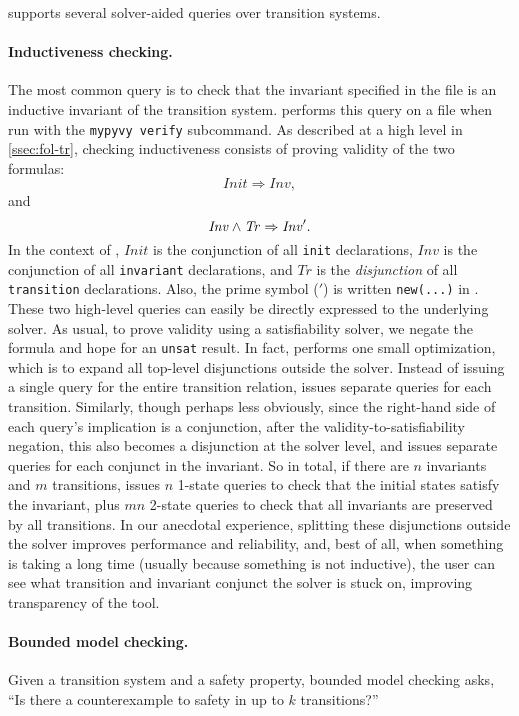 \mypyvy supports several solver-aided queries over transition systems.

\paragraph{Inductiveness checking.}
The most common query is to check that
  the invariant specified in the file is an inductive invariant
  of the transition system.
\mypyvy performs this query on a file
  when run with the \texttt{mypyvy verify} subcommand.
As described at a high level in \cref{ssec:fol-tr},
  checking inductiveness consists of proving validity of the two formulas:
\[
  \mathit{Init} \Rightarrow \mathit{Inv},
\]
and
\[
  \mathit{Inv} \land \mathit{Tr} \Rightarrow \mathit{Inv}'.
\]
In the context of \mypyvy,
  $\mathit{Init}$ is the conjunction of all \lstinline[language=mypyvy]{init} declarations,
  $\mathit{Inv}$ is the conjunction of all \lstinline[language=mypyvy]{invariant} declarations, and
  $\mathit{Tr}$ is the \emph{disjunction} of all \lstinline[language=mypyvy]{transition} declarations.
Also, the prime symbol ($'$) is written \lstinline[language=mypyvy]{new(...)} in \mypyvy.
These two high-level queries can easily be directly expressed to the underlying solver.
As usual, to prove validity using a satisfiability solver,
  we negate the formula and hope for an \texttt{unsat} result.
In fact, \mypyvy performs one small optimization,
  which is to expand all top-level disjunctions outside the solver.
Instead of issuing a single query for the entire transition relation,
  \mypyvy issues separate queries for each transition.
Similarly, though perhaps less obviously,
  since the right-hand side of each query's implication is a conjunction,
  after the validity-to-satisfiability negation,
  this also becomes a disjunction at the solver level,
  and \mypyvy issues separate queries for each conjunct in the invariant.
So in total, if there are $n$ invariants and $m$ transitions,
  \mypyvy issues $n$ 1-state queries to check that the initial states satisfy the invariant,
  plus $mn$ 2-state queries to check that all invariants are preserved by all transitions.
In our anecdotal experience,
  splitting these disjunctions outside the solver improves performance and reliability,
  and, best of all, when something is taking a long time (usually because something is not inductive),
  the user can see what transition and invariant conjunct the solver is stuck on,
  improving transparency of the tool.

\paragraph{Bounded model checking.}
Given a transition system and a safety property,
  bounded model checking asks,
  ``Is there a counterexample to safety in up to $k$ transitions?''

